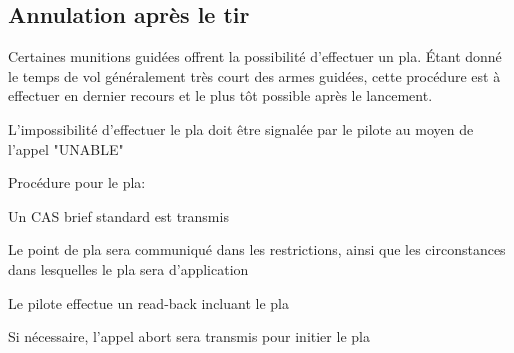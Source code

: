 \subsection{Annulation après le tir}

Certaines munitions guidées offrent la possibilité d'effectuer un \gls{pla}. Étant donné le temps de vol généralement très court des armes guidées, cette procédure est à effectuer en dernier recours et le plus tôt possible après le lancement.

\begin{e1}
	\item L'impossibilité d'effectuer le \gls{pla} doit être signalée par le pilote au moyen de l'appel "UNABLE"
	\item Procédure pour le \gls{pla}:
	\begin{e2}
		\item Un CAS brief standard est transmis
		\item Le point de \gls{pla} sera communiqué dans les restrictions, ainsi que les circonstances dans lesquelles le \gls{pla} sera d'application
		\item Le pilote effectue un read-back incluant le \gls{pla}
		\item Si nécessaire, l'appel \gls{abort} sera transmis pour initier le \gls{pla}
	\end{e2}
\end{e1}

